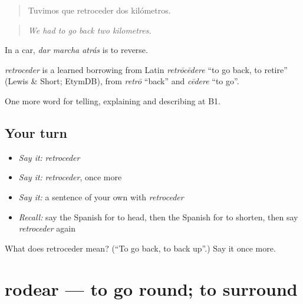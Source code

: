 \begin{quote}
Tuvimos que retroceder dos kilómetros.
\end{quote}

\begin{quote}
\emph{We had to go back two kilometres.}
\end{quote}

In a car, \emph{dar marcha atrás} is to reverse.

\begin{cousinweb}
\emph{retroceder} is a learned borrowing from Latin \emph{retrōcēdere} \textquotedblleft{}to go back, to retire\textquotedblright{} (Lewis \& Short; EtymDB), from \emph{retrō} \textquotedblleft{}back\textquotedblright{} and \emph{cēdere} \textquotedblleft{}to go\textquotedblright{}.
\end{cousinweb}

\begin{grammarlens}[title={What you've built}]
One more word for telling, explaining and describing at B1.
\end{grammarlens}

\subsection*{Your turn}
\begin{itemize}
\raggedright
  \item \emph{Say it:} \emph{retroceder}
  \item \emph{Say it:} \emph{retroceder}, once more
  \item \emph{Say it:} a sentence of your own with \emph{retroceder}
  \item \emph{Recall:} say the Spanish for to head, then the Spanish for to shorten, then say \emph{retroceder} again
\end{itemize}

\begin{tcolorbox}[breakable,colback=teal!4,colframe=teal!35!black,title={Before you move on}]
What does retroceder mean? (\textquotedblleft{}To go back, to back up\textquotedblright{}.) Say it once more.
\end{tcolorbox}
\section[rodear]{rodear — to go round; to surround}

\label{lesson:ES-C673-rodear}




